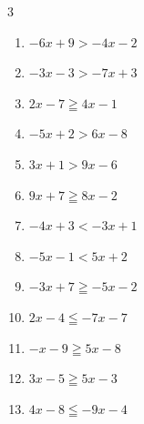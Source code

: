 \begin{multicols}{3}
\begin{enumerate}

  \item $-6x+9>-4x-2$


  \item $-3x-3>-7x+3$


  \item $2x-7\geqq 4x-1$

        \phantom{$\displaystyle x\leqq -3$}

  \item $-5x+2>6x-8$


  \item $3x+1>9x-6$


  \item $9x+7\geqq 8x-2$

        \phantom{$\displaystyle x\geqq -9$}

  \item $-4x+3<-3x+1$

        \phantom{$\displaystyle x>2$}

  \item $-5x-1<5x+2$


\columnbreak %

  \item $-3x+7\geqq -5x-2$


  \item $2x-4\leqq -7x-7$


  \item $-x-9\geqq 5x-8$


  \item $3x-5\geqq 5x-3$

        \phantom{$\displaystyle x\leqq -1$}

  \item $4x-8\leqq -9x-4$



\end{enumerate}
\end{multicols}
